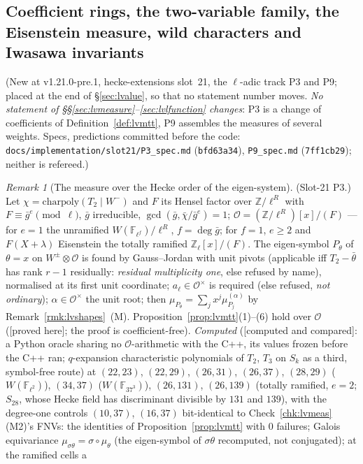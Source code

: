 \documentclass[11pt]{article}
\theoremstyle{remark}
\newtheorem{remark}[theorem]{Remark}
\newcommand{\F}{\mathbb{F}}
\newcommand{\Z}{\mathbb{Z}}
\newcommand{\PROVED}{\textsf{[proved here]}}
\newcommand{\CMPD}{\textsf{[computed and compared]}}   %
\begin{document}
\subsection{Coefficient rings, the two-variable family, the Eisenstein measure, wild characters and Iwasawa invariants}\label{sec:lvslot21}
(New at v1.21.0-pre.1, hecke-extensions slot~21, the $\ell$-adic track P3 and P9; placed at the end of \S\ref{sec:lvalue}, so that no statement number moves. \emph{No statement of
\S\S\ref{sec:lvmeasure}--\ref{sec:lvlfunction} changes}: P3 is a change of coefficients of Definition~\ref{def:lvmtt}, P9 assembles the measures of several weights. Specs, predictions
committed before the code: \texttt{docs/implementation/slot21/P3\_spec.md} (\texttt{bfd63a34}), \texttt{P9\_spec.md} (\texttt{7ff1cb29}); neither is refereed.)

\begin{remark}[The measure over the Hecke order of the eigen-system]\label{rmk:lvcoeffring}
(Slot-21 P3.) Let $\chi=\mathrm{charpoly}(T_2\mid W^{-})$ and $F$ its Hensel factor over $\Z/\ell^{R}$ with $F\equiv\bar g^{e}\pmod\ell$, $\bar g$ irreducible, $\gcd(\bar g,\bar\chi/\bar g^{e})=1$;
$\mathcal O=(\Z/\ell^{R})[x]/(F)$ --- for $e=1$ the unramified $W(\F_{\ell^{f}})/\ell^{R}$, $f=\deg\bar g$; for $f=1$, $e\ge2$ and $F(X+\lambda)$ Eisenstein the totally ramified $\Z_\ell[x]/(F)$. The
eigen-symbol $P_\theta$ of $\theta=x$ on $W^{\pm}\otimes\mathcal O$ is found by Gauss--Jordan with unit pivots (applicable iff $T_2-\bar\theta$ has rank $r-1$ residually: \emph{residual
multiplicity one}, else refused by name), normalised at its first unit coordinate; $a_\ell\in\mathcal O^{\times}$ is required (else refused, \emph{not ordinary}); $\alpha\in\mathcal O^{\times}$ the unit root;
then $\mu_{P_\theta}=\sum_jx^{j}\mu^{(\alpha)}_{P_j}$ by Remark~\ref{rmk:lvshapes}~(M). Proposition~\ref{prop:lvmtt}(1)--(6) hold over $\mathcal O$ (\PROVED; the proof is coefficient-free).
\emph{Computed} (\CMPD: a Python oracle sharing no $\mathcal O$-arithmetic with the C++, its values frozen before the C++ ran; $q$-expansion characteristic polynomials of $T_2$, $T_3$ on $S_k$
as a third, symbol-free route) at $(22,23)$, $(22,29)$, $(26,31)$, $(26,37)$, $(28,29)$ ($W(\F_{\ell^{2}})$), $(34,37)$ ($W(\F_{37^{3}})$), $(26,131)$, $(26,139)$ (totally ramified, $e=2$; $S_{28}$, whose Hecke
field has discriminant divisible by $131$ and $139$), with the degree-one controls $(10,37)$, $(16,37)$ bit-identical to Check~\ref{chk:lvmeas}(M2)'s FNVs: the identities of
Proposition~\ref{prop:lvmtt} with $0$ failures; Galois equivariance $\mu_{\sigma\theta}=\sigma\circ\mu_\theta$ (the eigen-symbol of $\sigma\theta$ recomputed, not conjugated); at the ramified cells a

\end{remark}
\end{document}
